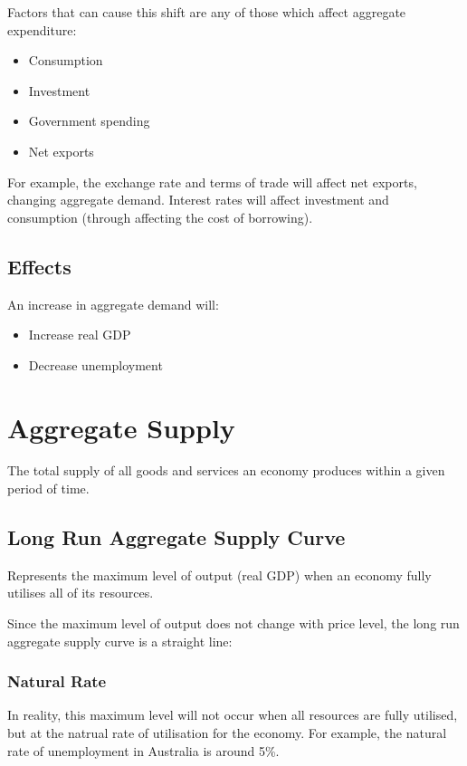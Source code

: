 \documentclass[a4paper,11pt]{report}
\begin{document}
Factors that can cause this shift are any of those which affect aggregate
expenditure:

\begin{itemize}
\item Consumption
\item Investment
\item Government spending
\item Net exports
\end{itemize}

For example, the exchange rate and terms of trade will affect net exports,
changing aggregate demand. Interest rates will affect investment and consumption
(through affecting the cost of borrowing).

\subsection{Effects}

An increase in aggregate demand will:

\begin{itemize}
\item Increase real GDP
\item Decrease unemployment
\end{itemize}


\section{Aggregate Supply}

The total supply of all goods and services an economy produces within a given
period of time.

\subsection{Long Run Aggregate Supply Curve}

Represents the maximum level of output (real GDP) when an economy fully utilises
all of its resources.

Since the maximum level of output does not change with price level, the long run
aggregate supply curve is a straight line:


\subsubsection{Natural Rate}

In reality, this maximum level will not occur when all resources are fully
utilised, but at the natrual rate of utilisation for the economy.  For example,
the natural rate of unemployment in Australia is around 5\%.
\end{document}
